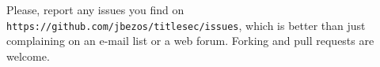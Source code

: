  
 
\begin{note}
  Please, report any issues you find on
  \texttt{https://github.com/jbezos/titlesec/issues}, which is better
  than just complaining on an e-mail list or a web forum. Forking
  and pull requests are welcome.
\end{note}

